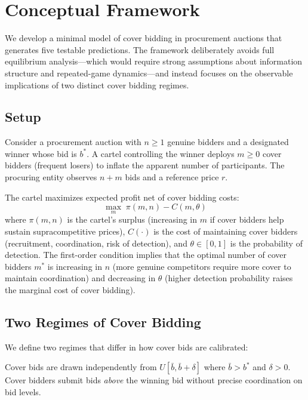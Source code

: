 \section{Conceptual Framework}
\label{sec:conceptual}

We develop a minimal model of cover bidding in procurement auctions that
generates five testable predictions. The framework deliberately avoids
full equilibrium analysis---which would require strong assumptions about
information structure and repeated-game dynamics---and instead focuses on
the observable implications of two distinct cover bidding regimes.

\subsection{Setup}

Consider a procurement auction with $n \geq 1$ genuine bidders and a
designated winner whose bid is $b^*$. A cartel controlling the winner
deploys $m \geq 0$ cover bidders (frequent losers) to inflate the
apparent number of participants. The procuring entity observes $n + m$
bids and a reference price $r$.

The cartel maximizes expected profit net of cover bidding costs:
\begin{equation}
  \max_{m} \; \pi(m, n) - C(m, \theta)
  \label{eq:cartel_foc}
\end{equation}
where $\pi(m, n)$ is the cartel's surplus (increasing in $m$ if cover
bidders help sustain supracompetitive prices), $C(\cdot)$ is the cost of
maintaining cover bidders (recruitment, coordination, risk of detection),
and $\theta \in [0,1]$ is the probability of detection. The first-order
condition implies that the optimal number of cover bidders $m^*$ is
increasing in $n$ (more genuine competitors require more cover to
maintain coordination) and decreasing in $\theta$ (higher detection
probability raises the marginal cost of cover bidding).

\subsection{Two Regimes of Cover Bidding}

We define two regimes that differ in how cover bids are calibrated:

\begin{definition}
\label{def:regime1}
Cover bids are drawn independently from $U[\bar{b}, \bar{b} + \delta]$
where $\bar{b} > b^*$ and $\delta > 0$. Cover bidders submit bids
\emph{above} the winning bid without precise coordination on bid levels.
\end{definition}

